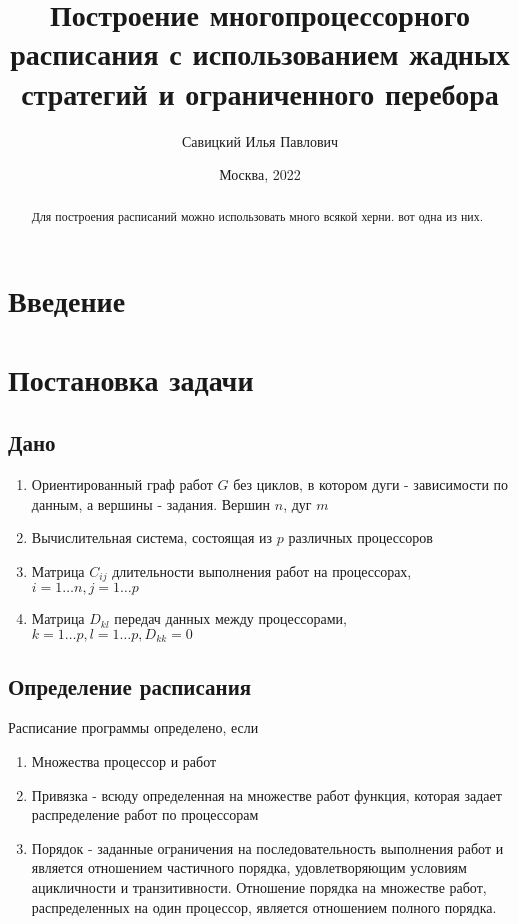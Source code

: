 \documentclass[12pt]{article}
\author{Савицкий Илья Павлович}
\title{Построение многопроцессорного расписания с использованием жадных стратегий и ограниченного перебора}
\date{Москва, 2022}
\begin{document}

\newpage
\begin{abstract}
    Для построения расписаний можно использовать много всякой херни. вот одна из них.
\end{abstract}
\newpage
\tableofcontents
\newpage
\section{Введение}

\newpage
\section{Постановка задачи}
\subsection*{Дано}
\begin{enumerate}
    \item Ориентированный граф работ $G$ без циклов, в котором дуги - зависимости по данным, а вершины - задания. Вершин $n$, дуг $m$
    \item Вычислительная система, состоящая из $p$ различных процессоров
    \item Матрица $C_{ij}$ длительности выполнения работ на процессорах, $i=1 \dots n, j=1 \dots p$
    \item Матрица $D_{kl}$ передач данных между процессорами, $k=1 \dots p, l = 1 \dots p, D_{kk} = 0$
\end{enumerate}
\subsection*{Определение расписания}
Расписание программы определено, если
\begin{enumerate}
    \item Множества процессор и работ
    \item Привязка - всюду определенная на множестве работ функция, которая задает распределение работ по процессорам
    \item Порядок - заданные ограничения на последовательность выполнения работ и является отношением частичного порядка, удовлетворяющим условиям ацикличности и транзитивности. Отношение порядка на множестве работ, распределенных на один процессор, является отношением полного порядка.
\end{enumerate}
\end{document}
